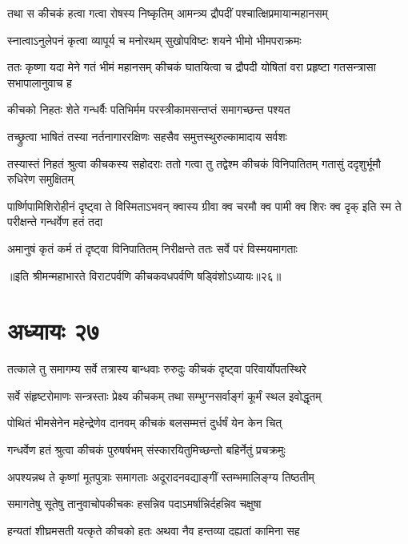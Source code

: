 \twolineshloka
{तथा स कीचकं हत्वा गत्वा रोषस्य निष्कृतिम्}
{आमन्त्र्य द्रौपदीं पश्चात्क्षिप्रमायान्महानसम्}


\twolineshloka
{स्नात्वाऽनुलेपनं कृत्वा व्यापूर्य च मनोरथम्}
{सुखोपविष्टः शयने भीमो भीमपराक्रमः}


\threelineshloka
{ततः कृष्णा यदा मेने गतं भीमं महानसम्}
{कीचकं घातयित्वा च द्रौपदी योषितां वरा}
{प्रहृष्टा गतसन्त्रासा सभापालानुवाच ह}


\twolineshloka
{कीचको निहतः शेते गन्धर्वैः पतिभिर्मम}
{परस्त्रीकामसन्तप्तं समागच्छन्त पश्यत}


\twolineshloka
{तच्छ्रुत्वा भाषितं तस्या नर्तनागाररक्षिणः}
{सहसैव समुत्तस्थुरुल्कामादाय सर्वशः}


\threelineshloka
{तस्यास्तं निहतं श्रुत्वा कीचकस्य सहोदराः}
{ततो गत्वा तु तद्वेश्म कीचकं विनिपातितम्}
{गतासुं ददृशुर्भूमौ रुधिरेण समुक्षितम्}


\onelineshloka
{पार्ष्णिपामिशिरोहीनं दृष्ट्वा ते विस्मिताऽभवन्}
\twolineshloka
{क्वास्य ग्रीवा क्व चरमौ क्व पामी क्व शिरः क्व दृक्}
{इति स्म ते परीक्षन्ते गन्धर्वेण हतं तदा}


\twolineshloka
{अमानुषं कृतं कर्म तं दृष्ट्वा विनिपातितम्}
{निरीक्षन्ते ततः सर्वे परं विस्मयमागताः}

॥इति श्रीमन्महाभारते विराटपर्वणि कीचकवधपर्वणि षड्विंशोऽध्यायः॥२६॥

\chapter{अध्यायः २७}

\twolineshloka
{तत्काले तु समागम्य सर्वे तत्रास्य बान्धवाः}
{रुरुदुः कीचकं दृष्ट्वा परिवार्योपतस्थिरे}





\twolineshloka
{सर्वे संहृष्टरोमाणः सन्त्रस्ताः प्रेक्ष्य कीचकम्}
{तथा सम्भुग्नसर्वाङ्गं कूर्मं स्थल इवोद्धृतम्}


\twolineshloka
{पोथितं भीमसेनेन महेन्द्रेणेव दानवम्}
{कीचकं बलसम्मत्तं दुर्धर्षं येन केन चित्}


\twolineshloka
{गन्धर्वेण हतं श्रुत्वा कीचकं पुरुषर्षभम्}
{संस्कारयितुमिच्छन्तो बहिर्नेतुं प्रचक्रमुः}


\twolineshloka
{अपश्यन्नथ ते कृष्णां मूतपुत्राः समागताः}
{अदूरादनवद्याङ्गीं स्तम्भमालिङ्ग्य तिष्ठतीम्}


\twolineshloka
{समागतेषु सूतेषु तानुवाचोपकीचकः}
{हसन्निव पदाऽमर्षान्निर्दहन्निव चक्षुषा}


\twolineshloka
{हन्यतां शीघ्रमसती यत्कृते कीचको हतः}
{अथवा नैव हन्तव्या दह्यतां कामिना सह}


